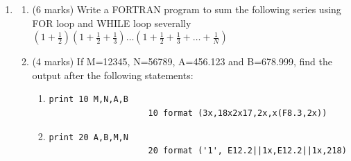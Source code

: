 \documentclass[12pt,oneside]{book}
\begin{document}
\begin{enumerate}
        \item \begin{enumerate}
            \item (6 marks) Write a FORTRAN program to sum the following series using FOR loop and WHILE loop severally $ (1+\frac{1}{2})(1+\frac{1}{2}+\frac{1}{3})\dots(1+\frac{1}{2}+\frac{1}{3}+\dots+\frac{1}{N}) $
            \item (4 marks) If M=12345, N=56789, A=456.123 and B=678.999, find the output after the following statements:
            \begin{enumerate}
                \item \begin{lstlisting}[numbers=none]
                    print 10 M,N,A,B
                    10 format (3x,18x2x17,2x,x(F8.3,2x))
                \end{lstlisting}
                \item \begin{lstlisting}[numbers=none]
                    print 20 A,B,M,N
                    20 format ('1', E12.2||1x,E12.2||1x,218)
                \end{lstlisting}
                

\end{enumerate}
\end{enumerate}
\end{enumerate}
\end{document}
